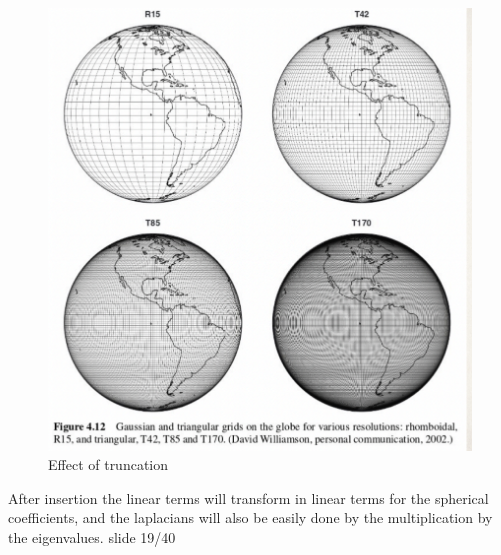 \begin{figure}[h]
    \centering
    \includegraphics[width=0.5\linewidth]{uploads/Screenshot 2024-11-17 205827.png}
    \caption{Effect of truncation}
    \label{fig:enter-label}
\end{figure}

After insertion the linear terms will transform in linear terms for the spherical coefficients, and the laplacians will also be easily done by the multiplication by the eigenvalues. slide 19/40


